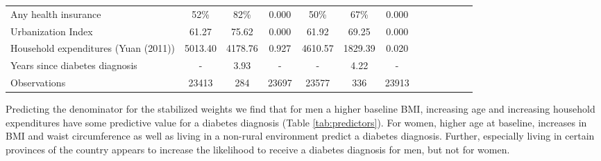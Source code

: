\begin{landscape}
\begin{table}[h]
\begin{center}
\begin{adjustbox}{max width=\linewidth}
{\begin{tabular}{l*{6}{SS}}
Any health insurance&        52\%&     82\%&     0.000       &        50\%&        67\%&       0.000      \\
Urbanization Index  &       61.27&     75.62&     0.000       &       61.92&       69.25&     0.000       \\
Household expenditures (Yuan (2011))&     5013.40&     4178.76&    0.927        &     4610.57&     1829.39&    0.020        \\
Years since diabetes diagnosis&       -&        3.93&      -      &        -&        4.22&      -      \\
\midrule
Observations        &       23413&         284&       23697&       23577&         336&       23913     \\
\bottomrule
\end{tabular}
}
\end{adjustbox}
\end{center}
\end{table}
\end{landscape}
\FloatBarrier

Predicting the denominator for the stabilized weights we find that for men a higher baseline \ac{BMI}, increasing age and increasing household expenditures have some predictive value for a diabetes diagnosis (Table \ref{tab:predictors}). For women, higher age at baseline, increases in \ac{BMI} and waist circumference  as well as living in a non-rural environment predict a diabetes diagnosis. Further, especially living in certain provinces of the country appears to increase the likelihood to receive a diabetes diagnosis for men, but not for women.

